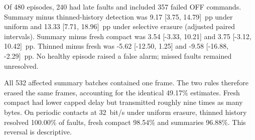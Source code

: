Of 480 episodes, 240 had late faults and included 357 failed OFF commands. Summary minus thinned-history detection was 9.17 [3.75, 14.79]~pp under uniform and 13.33 [7.71, 18.96]~pp under selective erasure (adjusted paired intervals). Summary minus fresh compact was 3.54 [-3.33, 10.21] and 3.75 [-3.12, 10.42]~pp. Thinned minus fresh was -5.62 [-12.50, 1.25] and -9.58 [-16.88, -2.29]~pp. No healthy episode raised a false alarm; missed faults remained unresolved.

All 532 affected summary batches contained one frame. The two rules therefore erased the same frames, accounting for the identical 49.17\% estimates. Fresh compact had lower capped delay but transmitted roughly nine times as many bytes. On periodic contacts at 32~bit/s under uniform erasure, thinned history resolved 100.00\% of faults, fresh compact 98.54\% and summaries 96.88\%. This reversal is descriptive.
